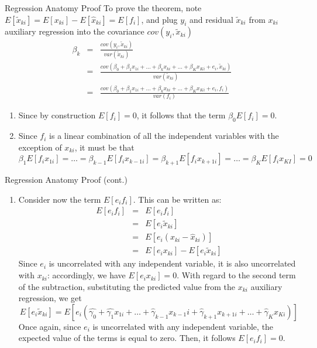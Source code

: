 \documentclass[notes=show]{beamer}
\begin{document}
\begin{frame}[plain, shrink=20]

\bigskip

	\begin{block}{Regression Anatomy Proof}
	To prove the theorem, note $E[\tilde{x}_{ki}]=E[x_{ki}]-E[\widehat{x}_{ki}]=E[f_i]$, and plug $y_i$ and residual $\tilde{x}_{ki}$ from $x_{ki}$ auxiliary regression into the covariance $cov(y_i, \tilde{x}_{ki})$
	\begin{eqnarray*}
	\beta_k &=& \frac{ cov(y_i, \tilde{x}_{ki})}{var(\tilde{x}_{ki})} \\
			 &=& \frac{ cov(\beta_0 + \beta_1x_{1i} + \dots + \beta_kx_{ki} + \dots + \beta_Kx_{Ki} + e_i, \tilde{x}_{ki})}{var(\tilde{x}_{ki})} \\
			&=& \frac{ cov(\beta_0 + \beta_1x_{1i} + \dots + \beta_kx_{ki} + \dots + \beta_Kx_{Ki} + e_i,f_i)}{var(f_i)}
	\end{eqnarray*}
	\begin{enumerate}
	\item Since by construction $E[f_i]=0$, it follows that the term $\beta_0E[f_i]=0$.
	\item Since $f_i$ is a linear combination of all the independent variables with the exception of $x_{ki}$, it must be that$$\beta_1E[f_ix_{1i}] = \dots = \beta_{k-1}E[f_ix_{k-1 i}] = \beta_{k+1}E[f_ix_{k+1 i}] = \dots = \beta_KE[f_ix_{KI}] = 0$$
	\end{enumerate}
	\end{block}
\end{frame}


\begin{frame}[plain, shrink=20]

	\begin{block}{Regression Anatomy Proof (cont.)}
		\begin{enumerate}\addtocounter{enumi}{2}
		\item Consider now the term $E[e_if_i]$.  This can be written as:
			\begin{eqnarray*}
			E[e_if_i] &=& E[e_if_i] \\
			&=& E[e_i\tilde{x}_{ki}] \\
			&=& E[e_i(x_{ki} - \widehat{x}_{ki})] \\
			&=& E[e_ix_{ki}] - E[e_i\tilde{x}_{ki}]
			\end{eqnarray*}Since $e_i$ is uncorrelated with any independent variable, it is also uncorrelated with $x_{ki}$: accordingly, we have $E[e_ix_{ki}]=0$. With regard to the second term of the subtraction, substituting the predicted value from the $x_{ki}$ auxiliary regression, we get$$E[e_i\tilde{x}_{ki}] = E[e_i(\widehat{\gamma_0} + \widehat{\gamma_1}x_{1i} + \dots + \widehat{\gamma}_{k-1}x_{k-1}i+\widehat{\gamma}_{k+1}x_{k+1 i} + \dots + \widehat{\gamma}_Kx_{Ki})]$$Once again, since $e_i$ is uncorrelated with any independent variable, the expected value of the terms is equal to zero.  Then, it follows $E[e_if_i]=0$.
		
		\end{enumerate}
	\end{block}

\end{frame}
\end{document}
